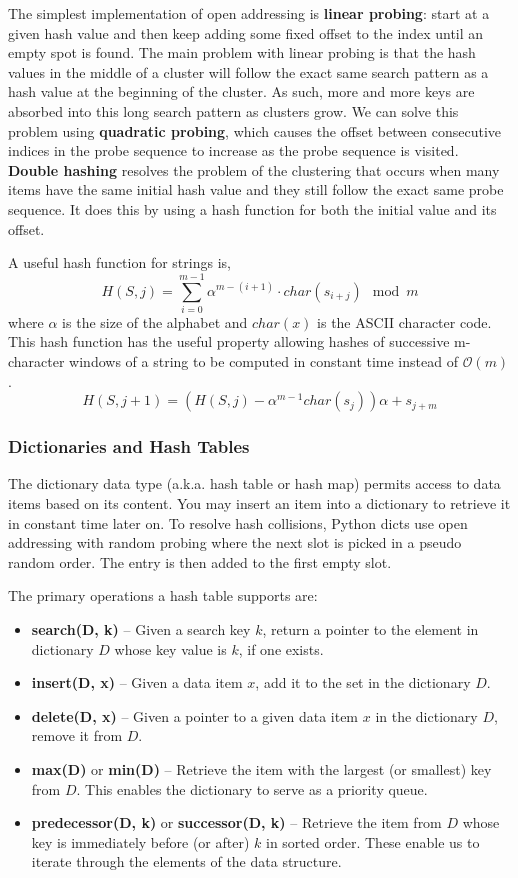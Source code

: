 \documentclass{article}
\newcommand{\bigO}{\mathcal{O}}
\begin{document}
    The simplest implementation of open addressing is \textbf{linear probing}: start at a given hash value and then keep adding some fixed offset to the index until an empty spot is found. The main problem with linear probing is that the hash values in the middle of a cluster will follow the exact same search pattern as a hash value at the beginning of the cluster. As such, more and more keys are absorbed into this long search pattern as clusters grow. We can solve this problem using \textbf{quadratic probing}, which causes the offset between consecutive indices in the probe sequence to increase as the probe sequence is visited. \textbf{Double hashing} resolves the problem of the clustering that occurs when many items have the same initial hash value and they still follow the exact same probe sequence. It does this by using a hash function for both the initial value and its offset.

    A useful hash function for strings is,
    \[
        H(S,j) = \sum_{i=0}^{m-1} \alpha^{m-(i+1)} \cdot char(s_{i+j}) \mod m
    \]
    where $\alpha$ is the size of the alphabet and $char(x)$ is the ASCII character code. This hash function has the useful property allowing hashes of successive m-character windows of a string to be computed in constant time instead of $\bigO(m)$.
    \[
        H(S, j+1) = (H(S,j) - \alpha^{m-1}char(s_j))\alpha + s_{j+m}
    \]
    
    \subsubsection{Dictionaries and Hash Tables}
    The dictionary data type (a.k.a. hash table or hash map) permits access to data items based on its content. You may insert an item into a dictionary to retrieve it in constant time later on. To resolve hash collisions, Python dicts use open addressing with random probing where the next slot is picked in a pseudo random order. The entry is then added to the first empty slot.
    
    The primary operations a hash table supports are:
    \begin{itemize}
        \item  \textbf{search(D, k)} – Given a search key $k$, return a pointer to the element in dictionary $D$ whose key value is $k$, if one exists.
        \item \textbf{insert(D, x)} – Given a data item $x$, add it to the set in the dictionary $D$.
        \item \textbf{delete(D, x)} – Given a pointer to a given data item $x$ in the dictionary $D$, remove it from $D$.
        \item \textbf{max(D)} or \textbf{min(D)} – Retrieve the item with the largest (or smallest) key from $D$. This enables the dictionary to serve as a priority queue.
        \item \textbf{predecessor(D, k)} or \textbf{successor(D, k)} – Retrieve the item from $D$ whose key is immediately before (or after) $k$ in sorted order. These enable us to iterate through the elements of the data structure.
    \end{itemize}
    
\end{document}
